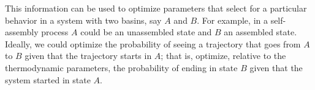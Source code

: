 \documentclass[11pt]{article}
\begin{document}
This information can be used to optimize parameters that select for a particular behavior in a system with two basins, say $A$ and $B$.  For example, in a self-assembly process $A$ could be an unassembled state and $B$ an assembled state.  Ideally, we could optimize the probability of seeing a trajectory that goes from $A$ to $B$ given that the trajectory starts in $A$; that is, optimize, relative to the thermodynamic parameters, the probability of ending in state $B$ given that the system started in state $A$.
\end{document}
